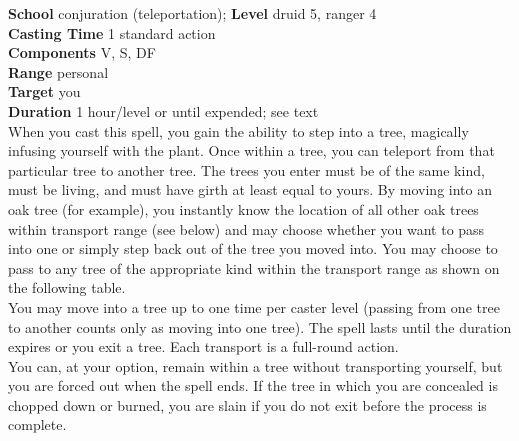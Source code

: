 \textbf{School} conjuration (teleportation); \textbf{Level} druid 5, ranger 4\\
\textbf{Casting Time} 1 standard action\\
\textbf{Components} V, S, DF\\
\textbf{Range} personal\\
\textbf{Target} you\\
\textbf{Duration} 1 hour/level or until expended; see text\\
When you cast this spell, you gain the ability to step into a tree, magically infusing yourself with the plant. Once within a tree, you can teleport from that particular tree to another tree. The trees you enter must be of the same kind, must be living, and must have girth at least equal to yours. By moving into an oak tree (for example), you instantly know the location of all other oak trees within transport range (see below) and may choose whether you want to pass into one or simply step back out of the tree you moved into. You may choose to pass to any tree of the appropriate kind within the transport range as shown on the following table.\\
You may move into a tree up to one time per caster level (passing from one tree to another counts only as moving into one tree). The spell lasts until the duration expires or you exit a tree. Each transport is a full-round action.\\
You can, at your option, remain within a tree without transporting yourself, but you are forced out when the spell ends. If the tree in which you are concealed is chopped down or burned, you are slain if you do not exit before the process is complete.\\
